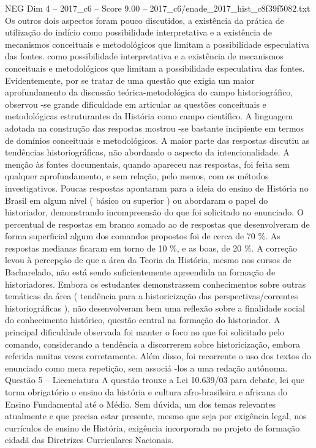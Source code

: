 \begin{textsample}{NEG Dim 4 – 2017\_c6 – Score 9.00 – 2017\_c6/enade\_2017\_hist\_c8f39f5082.txt}
Os outros dois aspectos foram pouco discutidos, a existência da prática de utilização do indício como possibilidade interpretativa e a existência de mecanismos conceituais e metodológicos que limitam a possibilidade especulativa das fontes. como possibilidade interpretativa e a existência de mecanismos conceituais e metodológicos que limitam a possibilidade especulativa das fontes.
Evidentemente, por se tratar de uma questão que exigia um maior aprofundamento da discussão teórica-metodológica do campo historiográfico, observou -se grande dificuldade em articular as questões conceituais e metodológicas estruturantes da História como campo científico.
A linguagem adotada na construção das respostas mostrou -se bastante incipiente em termos de domínios conceituais e metodológicos.
A maior parte das respostas discutiu as tendências historiográficas, não abordando o aspecto da intencionalidade.
A menção às fontes documentais, quando apareceu nas respostas, foi feita sem qualquer aprofundamento, e sem relação, pelo menos, com os métodos investigativos.
Poucas respostas apontaram para a ideia do ensino de História no Brasil em algum nível ( básico ou superior ) ou abordaram o papel do historiador, demonstrando incompreensão do que foi solicitado no enunciado.
O percentual de respostas em branco somado ao de respostas que desenvolveram de forma superficial algum dos comandos propostos foi de cerca de 70 \%.
As respostas medianas ficaram em torno de 10 \%, e as boas, de 20 \%.
A correção levou à percepção de que a área da Teoria da História, mesmo nos cursos de Bacharelado, não está sendo suficientemente apreendida na formação de historiadores.
Embora os estudantes demonstrassem conhecimentos sobre outras temáticas da área ( tendência para a historicização das perspectivas/correntes historiográficas ), não desenvolveram bem uma reflexão sobre a finalidade social do conhecimento histórico, questão central na formação do historiador.
A principal dificuldade observada foi manter o foco no que foi solicitado pelo comando, considerando a tendência a discorrerem sobre historicização, embora referida muitas vezes corretamente.
Além disso, foi recorrente o uso dos textos do enunciado como mera repetição, sem associá -los a uma redação autônoma.
Questão 5 – Licenciatura A questão trouxe a Lei 10.639/03 para debate, lei que torna obrigatório o ensino da história e cultura afro-brasileira e africana do Ensino Fundamental até o Médio.
Sem dúvida, um dos temas relevantes atualmente e que precisa estar presente, mesmo que seja por exigência legal, nos currículos de ensino de História, exigência incorporada no projeto de formação cidadã das Diretrizes Curriculares Nacionais.

\end{textsample}
